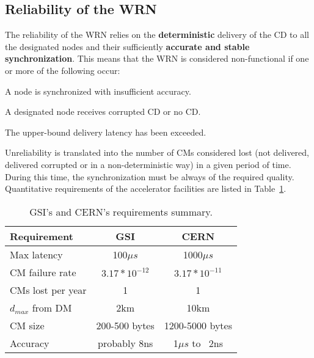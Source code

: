 \subsection{Reliability of the WRN}

The reliability of the WRN relies on the {\bf deterministic} delivery of the CD 
to all the designated nodes and their sufficiently {\bf accurate and stable synchronization}.  
This means that the WRN is considered non-functional if one or more of the following occur:
\begin{Itemize}
  \item A node is synchronized with insufficient accuracy.
  \item A designated node receives corrupted CD or no CD.
  \item The upper-bound delivery latency has been exceeded.
\end{Itemize}
Unreliability is translated into the number of CMs considered lost (not delivered, delivered 
corrupted or in a non-deterministic way) in a given period of time. During this time,  
the synchronization must be always of the required quality. 
Quantitative requirements of the accelerator facilities are listed in Table~\ref{tab:requirements}.

\begin{table}[ht]
\caption{GSI's and CERN's requirements summary.} 
\centering
	\begin{tabular}{| l | c | c |}                        \hline
\rowcolor{gray!35}{}
\textbf{Requirement}     & {\bf GSI}        & {\bf CERN}          \\ \hline
Max latency    		 & 100$\mu s$       & 1000$\mu s$         \\ \hline
CM failure rate          & $3.17*10^{-12}$  & $3.17*10^{-11}$     \\ \hline
CMs lost per year        & 1                & 1                   \\ \hline
$d_{max}$ from DM        & 2km              & 10km                \\ \hline
CM size 		 & 200-500 bytes    & 1200-5000 bytes     \\ \hline
Accuracy	  	 & probably 8ns     & 1$\mu s$ to  ~2ns   \\
\hline

\end{tabular}
\label{tab:requirements}
\end{table}